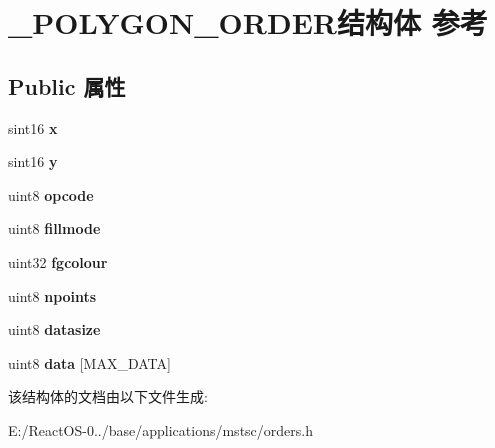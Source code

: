 \hypertarget{struct___p_o_l_y_g_o_n___o_r_d_e_r}{}\section{\+\_\+\+P\+O\+L\+Y\+G\+O\+N\+\_\+\+O\+R\+D\+E\+R结构体 参考}
\label{struct___p_o_l_y_g_o_n___o_r_d_e_r}
\subsection*{Public 属性}
\begin{DoxyCompactItemize}
\item 
\mbox{\label{struct___p_o_l_y_g_o_n___o_r_d_e_r_a075c3f6dd01613428151a7ac878e6ec6}} 
sint16 {\bfseries x}
\item 
\mbox{\label{struct___p_o_l_y_g_o_n___o_r_d_e_r_aba4cb15d31853b18099777a275aa851c}} 
sint16 {\bfseries y}
\item 
\mbox{\label{struct___p_o_l_y_g_o_n___o_r_d_e_r_a19aa5752a32cb4651d6f03ac471ee398}} 
uint8 {\bfseries opcode}
\item 
\mbox{\label{struct___p_o_l_y_g_o_n___o_r_d_e_r_a716c0e7e434933a0c93514b80b81dbc5}} 
uint8 {\bfseries fillmode}
\item 
\mbox{\label{struct___p_o_l_y_g_o_n___o_r_d_e_r_a69c3c748ef6a90ab67620923740ba444}} 
uint32 {\bfseries fgcolour}
\item 
\mbox{\label{struct___p_o_l_y_g_o_n___o_r_d_e_r_a4259243bdaf96c730dd23c88603fda80}} 
uint8 {\bfseries npoints}
\item 
\mbox{\label{struct___p_o_l_y_g_o_n___o_r_d_e_r_a1eef37aa3efe38b641ef75a3365dab62}} 
uint8 {\bfseries datasize}
\item 
\mbox{\label{struct___p_o_l_y_g_o_n___o_r_d_e_r_a16da1817fa30f2cc28b88f7ddca0ef50}} 
uint8 {\bfseries data} \mbox{[}M\+A\+X\+\_\+\+D\+A\+TA\mbox{]}
\end{DoxyCompactItemize}


该结构体的文档由以下文件生成\+:\begin{DoxyCompactItemize}
\item 
E\+:/\+React\+O\+S-\/0../base/applications/mstsc/orders.\+h\end{DoxyCompactItemize}
